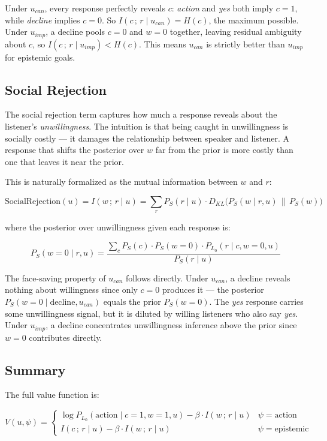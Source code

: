 \documentclass[12pt]{article}
\begin{document}
Under $u_{can}$, every response perfectly reveals $c$: \textit{action}
and \textit{yes} both imply $c=1$, while \textit{decline} implies
$c=0$. So $I(c\,;\,r \mid u_{can}) = H(c)$, the maximum possible.
Under $u_{imp}$, a decline pools $c=0$ and $w=0$ together, leaving
residual ambiguity about $c$, so $I(c\,;\,r \mid u_{imp}) < H(c)$.
This means $u_{can}$ is strictly better than $u_{imp}$ for epistemic
goals.

\subsection{Social Rejection}

The social rejection term captures how much a response reveals about the listener's \textit{unwillingness}. 
The intuition is that being caught in unwillingness is socially costly --- it damages the relationship between speaker and listener. 
A response that shifts the posterior over $w$ far from the prior is more costly than one that leaves it near the prior.

This is naturally formalized as the mutual information between $w$ and
$r$:

\[
\text{SocialRejection}(u) = I(w\,;\,r \mid u)
= \sum_r P_S(r \mid u)
  \cdot D_{KL}\bigl(P_S(w \mid r, u) \,\|\, P_S(w)\bigr)
\]

where the posterior over unwillingness given each response is:

\[
P_S(w=0 \mid r, u)
= \frac{\displaystyle\sum_c P_S(c) \cdot P_S(w=0)
  \cdot P_{L_0}(r \mid c, w=0, u)}{P_S(r \mid u)}
\]

The face-saving property of $u_{can}$ follows directly. Under
$u_{can}$, a decline reveals nothing about willingness since only
$c=0$ produces it --- the posterior $P_S(w=0 \mid \text{decline},
u_{can})$ equals the prior $P_S(w=0)$. The \textit{yes} response
carries some unwillingness signal, but it is diluted by willing
listeners who also say \textit{yes}. Under $u_{imp}$, a decline
concentrates unwillingness inference above the prior since $w=0$
contributes directly.

\subsection{Summary}

The full value function is:

\[
V(u, \psi) = \begin{cases}
\log P_{L_0}(\text{action} \mid c=1, w=1, u)
  - \beta \cdot I(w\,;\,r \mid u)
& \psi = \text{action} \\[6pt]
I(c\,;\,r \mid u) - \beta \cdot I(w\,;\,r \mid u)
& \psi = \text{epistemic}
\end{cases}
\]
\end{document}
